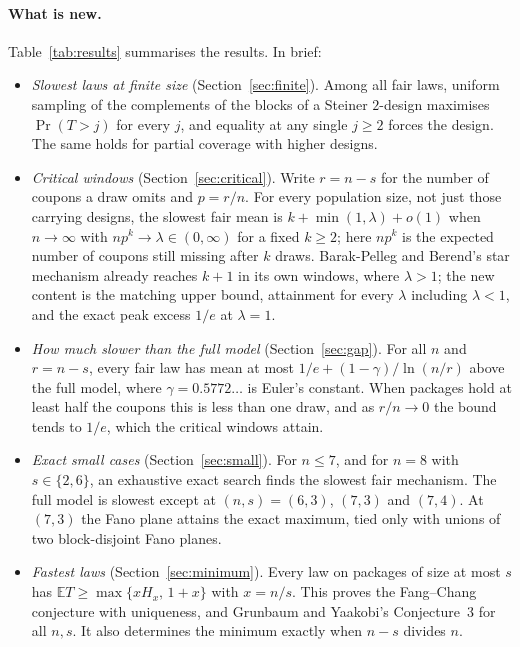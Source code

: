 \documentclass[11pt,a4paper]{article}
\theoremstyle{remark}
\newcommand{\E}{\mathbb E}
\begin{document}
\paragraph{What is new.} Table~\ref{tab:results} summarises the results. In brief:
\begin{itemize}
\item \emph{Slowest laws at finite size} (Section~\ref{sec:finite}). Among all fair laws, uniform sampling of the complements of the blocks of a Steiner $2$-design maximises $\Pr(T>j)$ for every $j$, and equality at any single $j\ge2$ forces the design. The same holds for partial coverage with higher designs.
\item \emph{Critical windows} (Section~\ref{sec:critical}). Write $r=n-s$ for the number of coupons a draw omits and $p=r/n$. For every population size, not just those carrying designs, the slowest fair mean is $k+\min(1,\lambda)+o(1)$ when $n\to\infty$ with $np^k\to\lambda\in(0,\infty)$ for a fixed $k\ge2$; here $np^k$ is the expected number of coupons still missing after $k$ draws. Barak-Pelleg and Berend's star mechanism already reaches $k+1$ in its own windows, where $\lambda>1$; the new content is the matching upper bound, attainment for every $\lambda$ including $\lambda<1$, and the exact peak excess $1/e$ at $\lambda=1$.
\item \emph{How much slower than the full model} (Section~\ref{sec:gap}). For all $n$ and $r=n-s$, every fair law has mean at most $1/e+(1-\gamma)/\ln(n/r)$ above the full model, where $\gamma=0.5772\ldots$ is Euler's constant. When packages hold at least half the coupons this is less than one draw, and as $r/n\to0$ the bound tends to $1/e$, which the critical windows attain.
\item \emph{Exact small cases} (Section~\ref{sec:small}). For $n\le7$, and for $n=8$ with $s\in\{2,6\}$, an exhaustive exact search finds the slowest fair mechanism. The full model is slowest except at $(n,s)=(6,3)$, $(7,3)$ and $(7,4)$. At $(7,3)$ the Fano plane attains the exact maximum, tied only with unions of two block-disjoint Fano planes.
\item \emph{Fastest laws} (Section~\ref{sec:minimum}). Every law on packages of size at most $s$ has $\E T\ge\max\{xH_x,\,1+x\}$ with $x=n/s$. This proves the Fang--Chang conjecture with uniqueness, and Grunbaum and Yaakobi's Conjecture~3 for all $n,s$. It also determines the minimum exactly when $n-s$ divides $n$.
\end{itemize}
\end{document}
